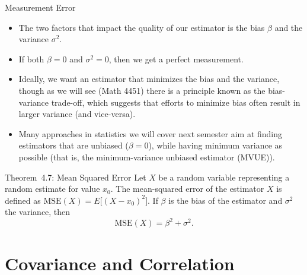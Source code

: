 \begin{frame}[allowframebreaks]{Measurement Error}
  \framebreak
  
\begin{itemize}
  \item The two factors that impact the quality of our estimator is the bias $\beta$ and the variance $\sigma^2$. 
  \item If both $\beta = 0$ and $\sigma^2 = 0$, then we get a perfect measurement.
  \item Ideally, we want an estimator that minimizes the bias and the variance, though as we will see (Math 4451) there is a principle known as the \alert{bias-variance} trade-off, which suggests that efforts to minimize bias often result in larger variance (and vice-versa).
  \item Many approaches in statistics we will cover next semester aim at finding estimators that are unbiased ($\beta = 0$), while having minimum variance as possible (that is, the minimum-variance unbiased estimator (MVUE)).
\end{itemize}

\framebreak

\begin{block}{Theorem~4.7: Mean Squared Error}
  Let $X$ be a random variable representing a random estimate for value $x_0$. The mean-squared error of the estimator $X$ is defined as $\text{MSE}(X) = E\big[(X-x_0)^2\big]$. If $\beta$ is the bias of the estimator and $\sigma^2$ the variance, then
  $$
  \text{MSE}(X) = \beta^2 + \sigma^2.
  $$
\end{block}

\end{frame}

\section{Covariance and Correlation}

